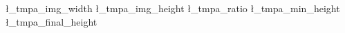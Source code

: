 \newcommand{\ATI@suspend}{%
  \setcounter{alttextimage@saved@equation}{\value{equation}}%
  \let\ATI@orig@label\label
  \let\label\@gobble
  \@ifundefined{eqlabel}{}{%
    \let\ATI@orig@eqlabel\eqlabel
    \zzcommand{\eqlabel}[2]{##2}%
  }%
}
\newcommand{\ATI@resume}{%
  \setcounter{equation}{\value{alttextimage@saved@equation}}%
  \let\label\ATI@orig@label
  \@ifundefined{ATI@orig@eqlabel}{}{%
    \let\eqlabel\ATI@orig@eqlabel
  }%
}


\newlength{\currentparindent}
\newlength{\currentparskip}
\newlength{\contentheightofalttextimage}
\newlength{\contentheightofalttextimagecaption}
\newsavebox{\alttextbox}

\ExplSyntaxOn
\newdimen\l_tmpa_img_width
\newdimen\l_tmpa_img_height
\newdimen\l_tmpa_ratio
\newdimen\l_tmpa_min_height
\newdimen\l_tmpa_final_height
\ExplSyntaxOff

